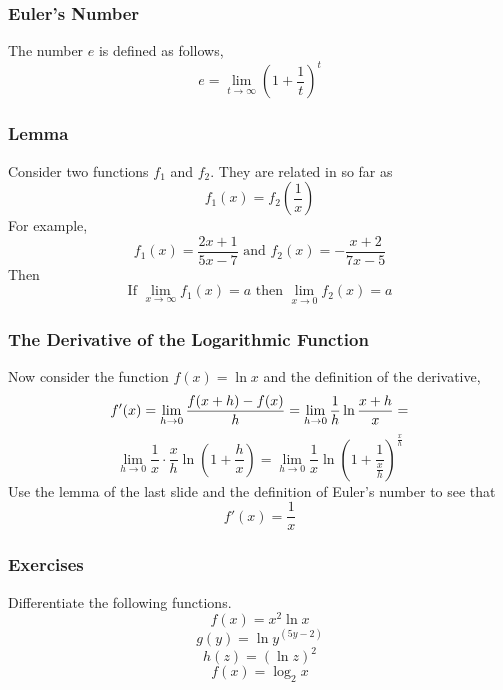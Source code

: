\documentclass[xcolor=dvipsnames]{beamer}
\begin{document}
\begin{frame}
  \frametitle{Euler's Number}
The number $e$ is defined as follows,
\begin{equation}
  \label{eq:ciedaeme}
  e=\lim_{t\rightarrow\infty}\left(1+\frac{1}{t}\right)^{t}
\end{equation}
\end{frame}

\begin{frame}
  \frametitle{Lemma}
Consider two functions $f_{1}$ and $f_{2}$. They are related in so far
as
\begin{equation}
  \label{eq:ohquailo}
  f_{1}(x)=f_{2}\left(\frac{1}{x}\right)
\end{equation}
For example,
\begin{equation}
  \label{eq:seemaxah}
  f_{1}(x)=\frac{2x+1}{5x-7}\mbox{ and }f_{2}(x)=-\frac{x+2}{7x-5}
\end{equation}
Then
\begin{equation}
  \label{eq:iebieluk}
  \mbox{If }\lim_{x\rightarrow\infty}f_{1}(x)=a\mbox{ then }\lim_{x\rightarrow{}0}f_{2}(x)=a
\end{equation}
\end{frame}

\begin{frame}
  \frametitle{The Derivative of the Logarithmic Function}
Now consider the function $f(x)=\ln{}x$ and the definition of the
derivative,
\begin{equation}
  \label{eq:eeghaphe}
  f'(x)=\lim_{h\rightarrow{}0}\frac{f(x+h)-f(x)}{h}=\lim_{h\rightarrow{}0}\frac{1}{h}\ln\frac{x+h}{x}=\notag
\end{equation}
\begin{equation}
  \label{eq:quanoefe}
  \lim_{h\rightarrow{}0}\frac{1}{x}\cdot\frac{x}{h}\ln\left(1+\frac{h}{x}\right)=\lim_{h\rightarrow{}0}\frac{1}{x}\ln\left(1+\frac{1}{\frac{x}{h}}\right)^{\frac{x}{h}}
\end{equation}
Use the lemma of the last slide and the definition of Euler's number to see that
\begin{equation}
  \label{eq:oozeexei}
  f'(x)=\frac{1}{x}
\end{equation}
\end{frame}

\begin{frame}
  \frametitle{Exercises}
  {\ubung} Differentiate the following functions.
  \begin{equation}
    \label{eq:eipovaif}
    f(x)=x^{2}\ln{}x
  \end{equation}
  \begin{equation}
    \label{eq:ejahshai}
    g(y)=\ln{}y^{(5y-2)}
  \end{equation}
  \begin{equation}
    \label{eq:nooshahw}
    h(z)=\left(\ln{}z\right)^{2}
  \end{equation}
  \begin{equation}
    \label{eq:weeshieb}
    f(x)=\log_{2}x
  \end{equation}
\end{frame}
\end{document}
